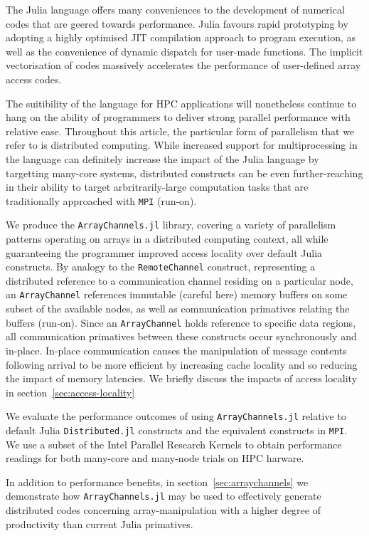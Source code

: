 The Julia language offers many conveniences to the development of
numerical codes that are geered towards performance. Julia favours rapid
prototyping by adopting a highly optimised JIT compilation approach to
program execution, as well as the convenience of dynamic dispatch for
user-made functions. The implicit vectorisation of codes massively
accelerates the performance of user-defined array access codes.

The suitibility of the language for HPC applications will nonetheless
continue to hang on the ability of programmers to deliver strong
parallel performance with relative ease. Throughout this article, the
particular form of parallelism that we refer to is distributed
computing. While increased support for multiprocessing in the language
can definitely increase the impact of the Julia language by targetting
many-core systems, distributed constructs can be even further-reaching
in their ability to target arbritrarily-large computation tasks that are
traditionally approached with \texttt{MPI} (run-on).

We produce the \texttt{ArrayChannels.jl} library, covering a variety of
parallelism patterns operating on arrays in a distributed computing
context, all while guaranteeing the programmer improved access locality
over default Julia constructs. By analogy to the \texttt{RemoteChannel}
construct, representing a distributed reference to a communication
channel residing on a particular node, an \texttt{ArrayChannel}
references immutable (careful here) memory buffers on some subset of the
available nodes, as well as communication primatives relating the
buffers (run-on). Since an \texttt{ArrayChannel} holds reference to
specific data regions, all communication primatives between these
constructs occur synchronously and in-place. In-place communication
causes the manipulation of message contents following arrival to be more
efficient by increasing cache locality and so reducing the impact of
memory latencies. We briefly discuss the impacts of access locality in
section~\ref{sec:access-locality}

We evaluate the performance outcomes of using \texttt{ArrayChannels.jl}
relative to default Julia \texttt{Distributed.jl} constructs and the
equivalent constructs in \texttt{MPI}. We use a subset of the Intel
Parallel Research Kernels to obtain performance readings for both
many-core and many-node trials on HPC harware.

In addition to performance benefits, in section~\ref{sec:arraychannels}
we demonstrate how \texttt{ArrayChannels.jl} may be used to effectively
generate distributed codes concerning array-manipulation with a higher
degree of productivity than current Julia primatives.
